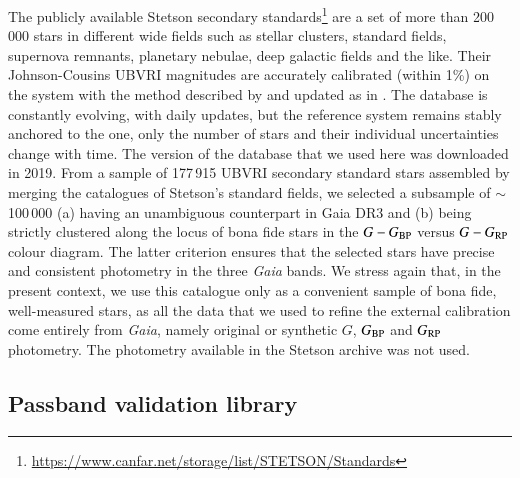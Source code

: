 \documentclass{aa}
\newcommand{\gaia}{\textit{Gaia}\xspace}
\newcommand{\gbp}{\ensuremath{G_{\rm BP}}\xspace}
\newcommand{\grp}{\ensuremath{G_{\rm RP}}\xspace}
\begin{document}
\begin{appendix}
The publicly available Stetson secondary standards\footnote{\url{https://www.canfar.net/storage/list/STETSON/Standards}} are a set of more than 200\,000 stars in different wide fields such as stellar clusters, standard fields, supernova remnants, planetary nebulae, deep galactic fields and the like. Their Johnson-Cousins UBVRI magnitudes are accurately calibrated (within 1\%) on the \citet{landolt92} system with the method described by \citet{2000PASP..112..925S} and updated as in \citet{stetson19}. The database is constantly evolving, with daily updates, but the reference system remains stably anchored to the \citet{landolt92} one, only the number of stars and their individual uncertainties change with time. The version of the database that we used here was downloaded in 2019. From a sample of 177\,915 UBVRI secondary standard stars assembled by merging the catalogues of Stetson’s standard fields, we selected a subsample of $\sim$100\,000 (a) having an unambiguous counterpart in Gaia DR3 and (b) being strictly clustered along the locus of bona fide stars in the $G-\gbp$ versus $G-\grp$ colour diagram. The latter criterion ensures that the selected stars have precise and consistent photometry in the three \gaia bands. We stress again that, in the present context, we use this catalogue only as a convenient sample of bona fide, well-measured stars, as all the data that we used to refine the external calibration come entirely from \gaia, namely original or synthetic $G$, \gbp and \grp photometry. The photometry available in the Stetson archive was not used.

\subsection{Passband validation library}


\end{appendix}
\end{document}
